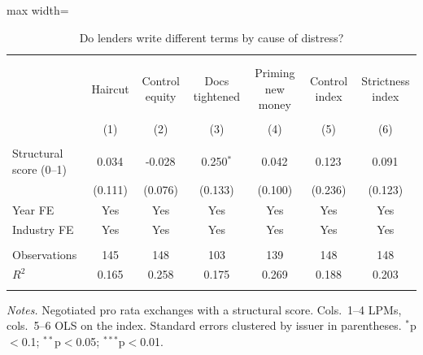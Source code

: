 \begin{table}[!htbp] \centering
  \caption{Do lenders write different terms by cause of distress?}
\begin{adjustbox}{max width=\textwidth}
\begin{tabular}{@{\extracolsep{2pt}}lcccccc}
\\[-1.8ex]\hline
\hline \\[-1.8ex]
\\[-1.8ex] & \multicolumn{1}{c}{Haircut} & \multicolumn{1}{c}{Control equity} & \multicolumn{1}{c}{Docs tightened} & \multicolumn{1}{c}{Priming new money} & \multicolumn{1}{c}{Control index} & \multicolumn{1}{c}{Strictness index}  \\
\\[-1.8ex] & (1) & (2) & (3) & (4) & (5) & (6) \\
\hline \\[-1.8ex]
 Structural score (0--1) & 0.034$^{}$ & -0.028$^{}$ & 0.250$^{*}$ & 0.042$^{}$ & 0.123$^{}$ & 0.091$^{}$ \\
& (0.111) & (0.076) & (0.133) & (0.100) & (0.236) & (0.123) \\
 Year FE & Yes & Yes & Yes & Yes & Yes & Yes \\
 Industry FE & Yes & Yes & Yes & Yes & Yes & Yes \\
\hline \\[-1.8ex]
 Observations & 145 & 148 & 103 & 139 & 148 & 148 \\
 $R^2$ & 0.165 & 0.258 & 0.175 & 0.269 & 0.188 & 0.203 \\
\hline
\hline \\[-1.8ex]
\end{tabular}
\end{adjustbox}
\label{tab:reg_terms}
\begin{minipage}{0.95\textwidth}\vspace{4pt}\footnotesize
\textit{Notes.} Negotiated pro rata exchanges with a structural score. Cols.\ 1--4 LPMs, cols.\ 5--6 OLS on the index. Standard errors clustered by issuer in parentheses. $^{*}$p$<$0.1; $^{**}$p$<$0.05; $^{***}$p$<$0.01.
\end{minipage}
\end{table}

